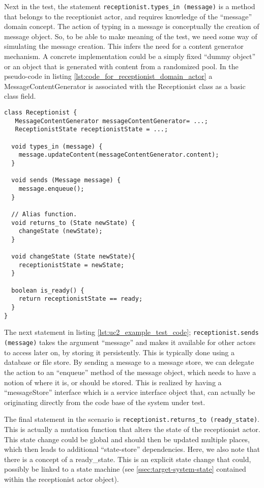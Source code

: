 \noindent Next in the test, the statement \texttt{receptionist.types\_in~(message)} is a method that belongs to the receptionist actor, and requires knowledge of the ``message'' domain concept. The action of typing in a message is conceptually the creation of message object. So, to be able to make meaning of the test, we need some way of simulating the message creation. This infers the need for a content generator mechanism. A concrete implementation could be a simply fixed ``dummy object'' or an object that is generated with content from a randomized pool. In the pseudo-code in listing \ref{lst:code_for_receptionist_domain_actor} a MessageContentGenerator is associated with the Receptionist class as a basic class field.
\begin{lstlisting}[style=Dart, caption=Pseudo code representing Receptionist domain actor,label={lst:code_for_receptionist_domain_actor}]
class Receptionist {
   MessageContentGenerator messageContentGenerator= ...;
   ReceptionistState receptionistState = ...;
  
  void types_in (message) {
  	message.updateContent(messageContentGenerator.content);
  }
  
  void sends (Message message) {
    message.enqueue();
  }
  
  // Alias function.
  void returns_to (State newState) {
  	changeState (newState);
  }
  
  void changeState (State newState){
  	receptionistState = newState;
  }
  
  boolean is_ready() {
    return receptionistState == ready;
  }
}
\end{lstlisting}
The next statement in listing \ref{lst:uc2_example_test_code}; \texttt{receptionist.sends (message)} takes the argument ``message'' and makes it available for other actors to access later on, by storing it persistently. This is typically done using a database or file store. By sending a message to a message store, we can delegate the action to an ``enqueue'' method of the message object, which needs to have a notion of where it is, or should be stored. This is realized by having a ``messageStore'' interface which is a service interface object that, can actually be originating directly from the code base of the system under test.\medskip

\noindent The final statement in the scenario is \texttt{receptionist.returns\_to (ready\_state)}. This is actually a mutation function that alters the state of the receptionist actor. This state change could be global and should then  be updated multiple places, which then leads to additional ``state-store'' dependencies. Here, we also note that there is a concept of a ready\_state. This is an explicit state change that could, possibly be linked to a state machine (see \ref{ssec:target-system-state} contained within the receptionist actor object).\medskip


